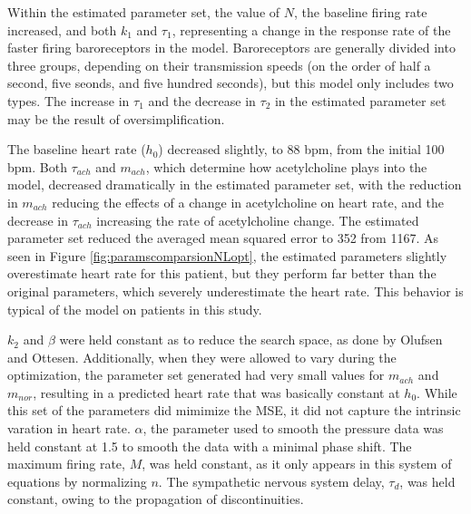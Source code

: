 \documentclass[fleqn,10pt]{wlscirep}
\begin{document}
Within the estimated parameter set, the value of $N$, the baseline firing rate increased, and both $k_1$ and $\tau_1$, representing a change in the response rate of the faster firing baroreceptors in the model. Baroreceptors are generally divided into three groups, depending on their transmission speeds (on the order of half a second, five seonds, and five hundred seconds), but this model only includes two types. \cite{ottesen1996non} The increase in $\tau_1$ and the decrease in $\tau_2$ in the estimated parameter set may be the result of oversimplification. 

The baseline heart rate ($h_0$) decreased slightly, to 88 bpm, from the initial 100 bpm. Both $\tau_{ach}$ and $m_{ach}$, which determine how acetylcholine plays into the model, decreased dramatically in the estimated parameter set, with the reduction in $m_{ach}$ reducing the effects of a change in acetylcholine on heart rate, and the decrease in $\tau_{ach}$ increasing the rate of acetylcholine change. The estimated parameter set reduced the averaged mean squared error to 352 from 1167. As seen in Figure \ref{fig:paramscomparsionNLopt}, the estimated parameters slightly overestimate heart rate for this patient, but they perform far better than the original parameters, which severely underestimate the heart rate. This behavior is typical of the model on patients in this study.

$k_2$ and $\beta$ were held constant as to reduce the search space, as done by Olufsen and Ottesen. Additionally, when they were allowed to vary during the optimization, the parameter set generated had very small values for $m_{ach}$ and $m_{nor}$, resulting in a predicted heart rate that was basically constant at $h_0$. While this set of the parameters did mimimize the MSE, it did not capture the intrinsic varation in heart rate. $\alpha$, the parameter used to smooth the pressure data was held constant at 1.5 to smooth the data with a minimal phase shift. The maximum firing rate, $M$, was held constant, as it only appears in this system of equations by normalizing $n$. The sympathetic nervous system delay, $\tau_d$, was held constant, owing to the propagation of discontinuities. \cite{baker1997pitfalls}
\end{document}
